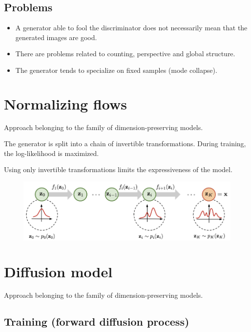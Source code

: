 \subsection{Problems}

\begin{itemize}
    \item A generator able to fool the discriminator does not necessarily mean that the generated images are good.
    \item There are problems related to counting, perspective and global structure.
    \item The generator tends to specialize on fixed samples (mode collapse).
\end{itemize}



\section{Normalizing flows}

Approach belonging to the family of dimension-preserving models.

The generator is split into a chain of invertible transformations.
During training, the log-likelihood is maximized.

\begin{remark}
    Using only invertible transformations limits the expressiveness of the model.
\end{remark}

\begin{figure}[H]
    \centering
    \includegraphics[width=0.65\linewidth]{./img/normalizing_flow.png}
\end{figure}



\section{Diffusion model}

Approach belonging to the family of dimension-preserving models.


\subsection{Training (forward diffusion process)}

